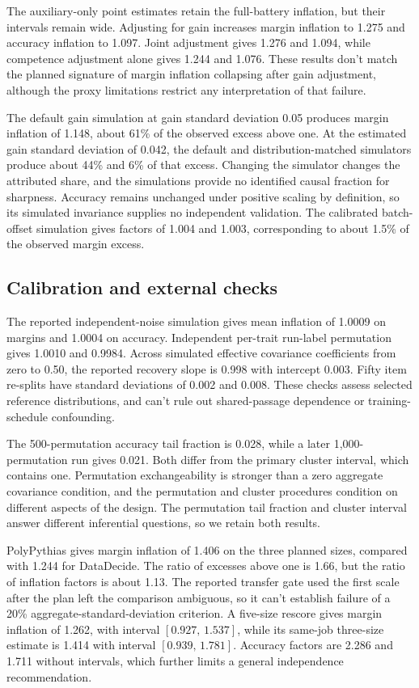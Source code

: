 \documentclass{article}
\newcommand{\ci}[2]{\ensuremath{[#1,\,#2]}}
\begin{document}
The auxiliary-only point estimates retain the full-battery inflation, but their intervals remain wide. Adjusting for gain increases margin inflation to 1.275 and accuracy inflation to 1.097. Joint adjustment gives 1.276 and 1.094, while competence adjustment alone gives 1.244 and 1.076. These results don't match the planned signature of margin inflation collapsing after gain adjustment, although the proxy limitations restrict any interpretation of that failure.

The default gain simulation at gain standard deviation 0.05 produces margin inflation of 1.148, about 61\% of the observed excess above one. At the estimated gain standard deviation of 0.042, the default and distribution-matched simulators produce about 44\% and 6\% of that excess. Changing the simulator changes the attributed share, and the simulations provide no identified causal fraction for sharpness. Accuracy remains unchanged under positive scaling by definition, so its simulated invariance supplies no independent validation. The calibrated batch-offset simulation gives factors of 1.004 and 1.003, corresponding to about 1.5\% of the observed margin excess.

\subsection{Calibration and external checks}
The reported independent-noise simulation gives mean inflation of 1.0009 on margins and 1.0004 on accuracy. Independent per-trait run-label permutation gives 1.0010 and 0.9984. Across simulated effective covariance coefficients from zero to 0.50, the reported recovery slope is 0.998 with intercept 0.003. Fifty item re-splits have standard deviations of 0.002 and 0.008. These checks assess selected reference distributions, and can't rule out shared-passage dependence or training-schedule confounding.

The 500-permutation accuracy tail fraction is 0.028, while a later 1,000-permutation run gives 0.021. Both differ from the primary cluster interval, which contains one. Permutation exchangeability is stronger than a zero aggregate covariance condition, and the permutation and cluster procedures condition on different aspects of the design. The permutation tail fraction and cluster interval answer different inferential questions, so we retain both results.

PolyPythias gives margin inflation of 1.406 on the three planned sizes, compared with 1.244 for DataDecide. The ratio of excesses above one is 1.66, but the ratio of inflation factors is about 1.13. The reported transfer gate used the first scale after the plan left the comparison ambiguous, so it can't establish failure of a 20\% aggregate-standard-deviation criterion. A five-size rescore gives margin inflation of 1.262, with interval \ci{0.927}{1.537}, while its same-job three-size estimate is 1.414 with interval \ci{0.939}{1.781}. Accuracy factors are 2.286 and 1.711 without intervals, which further limits a general independence recommendation.
\end{document}
